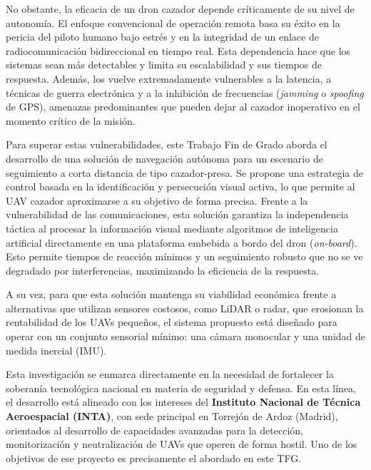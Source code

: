 \vspace{0.4cm}

No obstante, la eficacia de un dron cazador depende críticamente de su nivel de autonomía. El enfoque convencional de operación remota basa su éxito en la pericia del piloto humano bajo estrés y en la integridad de un enlace de radiocomunicación bidireccional en tiempo real. Esta dependencia hace que los sistemas sean más detectables y limita su escalabilidad y sus tiempos de respuesta. Además, los vuelve extremadamente vulnerables a la latencia, a técnicas de guerra electrónica y a la inhibición de frecuencias (\textit{jamming} o \textit{spoofing} de GPS), amenazas predominantes que pueden dejar al cazador inoperativo en el momento crítico de la misión.

\vspace{0.8cm}

Para superar estas vulnerabilidades, este Trabajo Fin de Grado aborda el desarrollo de una solución de navegación autónoma para un escenario de seguimiento a corta distancia de tipo cazador-presa. Se propone una estrategia de control basada en la identificación y persecución visual activa, lo que permite al UAV cazador aproximarse a su objetivo de forma precisa. Frente a la vulnerabilidad de las comunicaciones, esta solución garantiza la independencia táctica al procesar la información visual mediante algoritmos de inteligencia artificial directamente en una plataforma embebida a bordo del dron (\textit{on-board}). Esto permite tiempos de reacción mínimos y un seguimiento robusto que no se ve degradado por interferencias, maximizando la eficiencia de la respuesta.

\vspace{0.4cm}

A su vez, para que esta solución mantenga su viabilidad económica frente a alternativas que utilizan sensores costosos, como LiDAR o radar, que erosionan la rentabilidad de los UAVs pequeños, el sistema propuesto está diseñado para operar con un conjunto sensorial mínimo: una cámara monocular y una unidad de medida inercial (IMU).


\vspace{0.4cm}

Esta investigación se enmarca directamente en la necesidad de fortalecer la soberanía tecnológica nacional en materia de seguridad y defensa. En esta línea, el desarrollo está alineado con los intereses del \textbf{Instituto Nacional de Técnica Aeroespacial (INTA)}, con sede principal en Torrejón de Ardoz (Madrid), orientados al desarrollo de capacidades avanzadas para la detección, monitorización y neutralización de UAVs que operen de forma hostil. Uno de los objetivos de ese proyecto es precisamente el abordado en este TFG.

